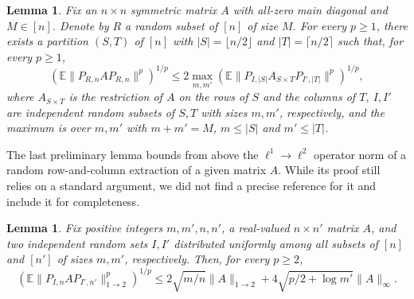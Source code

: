 \documentclass[reqno,a4paper]{amsart}
\newtheorem{lemma}[theorem]{Lemma}
\theoremstyle{definition}
\begin{document}
\begin{lemma}\label{lem:decoupling}
Fix an $n\times n$ symmetric matrix $A$ with all-zero main diagonal and $M\in [n]$.
Denote by $R$ a random subset of $[n]$ of size $M$.
For every $p\ge 1$, there exists a partition $(S,T)$ of $[n]$ with $|S|=\lfloor n/2\rfloor$ and $|T|=\lceil n/2\rceil$ such that, for every $p\ge 1$,
\begin{equation}\label{eq:decoupling}
        (\mathbb E \|P_{R,n} A P_{R,n}\|^p)^{1/p}
        \le
        2\max_{m,m'} (\mathbb E
        \|P_{I,|S|} A_{S\times T} P_{I',|T|}\|^p)^{1/p},
\end{equation}
where $A_{S\times T}$ is the restriction of $A$ on the rows of $S$ and the columns of $T$, $I,I'$ are independent random subsets of $S,T$ with sizes $m,m'$, respectively, and the maximum is over $m,m'$ with $m+m'=M$, $m\le |S|$ and $m'\le |T|$.
\end{lemma}

The last preliminary lemma bounds from above the $\ell^1\to \ell^2$ operator norm of a random row-and-column extraction of a given matrix $A$. While its proof still relies on a standard argument, we did not find a precise reference for it and include it for completeness.

\begin{lemma}\label{lem:selected-column}
Fix positive integers $m,m',n,n'$, a real-valued $n\times n'$ matrix $A$, and two independent random sets $I,I'$ distributed uniformly among all subsets of $[n]$ and $[n']$ of sizes $m,m'$, respectively.
Then, for every $p\ge 2$,
\begin{equation}\label{eq:selected-column}
        (\mathbb E \|P_{I,n}AP_{I',n'}\|^p_{1\to 2})^{1/p}
        \le
        2\sqrt{m/n} \|A\|_{1\to2}
        + 4\sqrt{p/2+\log m'}\|A\|_{\infty}.
\end{equation}
\end{lemma}
\end{document}

